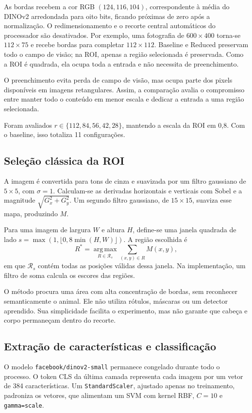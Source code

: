\documentclass[conference]{IEEEtran}
\begin{document}
As bordas recebem a cor RGB $(124,116,104)$, correspondente à média
do DINOv2 arredondada para oito bits, ficando próximas de zero após
a normalização. O redimensionamento e o recorte central automáticos
do processador são desativados. Por exemplo, uma fotografia de
$600\times400$ torna-se $112\times75$ e recebe bordas para completar
$112\times112$. Baseline e Reduced preservam todo o campo de visão;
na ROI, apenas a região selecionada é preservada. Como a ROI é
quadrada, ela ocupa toda a entrada e não necessita de preenchimento.

O preenchimento evita perda de campo de visão, mas ocupa parte dos
pixels disponíveis em imagens retangulares. Assim, a comparação
avalia o compromisso entre manter todo o conteúdo em menor escala
e dedicar a entrada a uma região selecionada.

Foram avaliados $r\in\{112,84,56,42,28\}$, mantendo a escala da ROI
em 0,8. Com o baseline, isso totaliza 11 configurações.

\subsection{Seleção clássica da ROI}
A imagem é convertida para tons de cinza e suavizada por um filtro
gaussiano de $5\times5$, com $\sigma=1$. Calculam-se as derivadas
horizontais e verticais com Sobel e a magnitude
$\sqrt{G_x^2+G_y^2}$. Um segundo filtro gaussiano, de $15\times15$,
suaviza esse mapa, produzindo $M$.

Para uma imagem de largura $W$ e altura $H$, define-se uma janela
quadrada de lado $s=\max(1,\lfloor0{,}8\min(H,W)\rfloor)$.
A região escolhida é
\begin{equation}
R^*=\underset{R\in\mathcal{R}_s}{\operatorname{arg\,max}}
\sum_{(x,y)\in R} M(x,y),
\end{equation}
em que $\mathcal{R}_s$ contém todas as posições válidas dessa janela.
Na implementação, um filtro de soma calcula os escores das regiões.

O método procura uma área com alta concentração de bordas, sem
reconhecer semanticamente o animal. Ele não utiliza rótulos, máscaras
ou um detector aprendido. Sua simplicidade facilita o experimento,
mas não garante que cabeça e corpo permaneçam dentro do recorte.

\subsection{Extração de características e classificação}
O modelo \texttt{facebook/dinov2-small} permanece congelado durante
todo o processo. O token CLS da última camada representa cada imagem
por um vetor de 384 características. Um \texttt{StandardScaler},
ajustado apenas no treinamento, padroniza os vetores, que alimentam
um SVM com kernel RBF, $C=10$ e \texttt{gamma=scale}.
\end{document}

